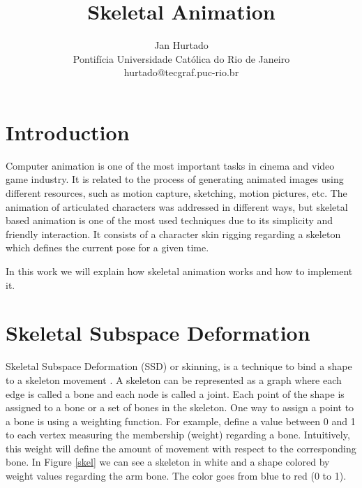 \documentclass[10pt]{article} %
\title{Skeletal Animation}
\author{Jan Hurtado \\ Pontifícia Universidade Católica do Rio de Janeiro \\ hurtado@tecgraf.puc-rio.br}
\date{} %
\begin{document}
\maketitle

\section{Introduction}
Computer animation is one of the most important tasks in cinema and video game industry. It is related to the process of generating animated images using different resources, such as motion capture, sketching, motion pictures, etc. The animation of articulated characters was addressed in different ways, but skeletal based animation is one of the most used techniques due to its simplicity and friendly interaction. It consists of a character skin rigging regarding a skeleton which defines the current pose for a given time. 

In this work we will explain how skeletal animation works and how to implement it.

\section{Skeletal Subspace Deformation}

Skeletal Subspace Deformation (SSD) or skinning, is a technique to bind a shape to a skeleton movement \cite{ssd}. A skeleton can be represented as a graph where each edge is called a bone and each node is called a joint. Each point of the shape is assigned to a bone or a set of bones in the skeleton. One way to assign a point to a bone is using a weighting function. For example, define a value between 0 and 1 to each vertex measuring the membership (weight) regarding a bone. Intuitively, this weight will define the amount of movement with respect to the corresponding bone. In Figure \ref{skel} we can see a skeleton in white and a shape colored by weight values regarding the arm bone. The color goes from blue to red (0 to 1).
\end{document}
